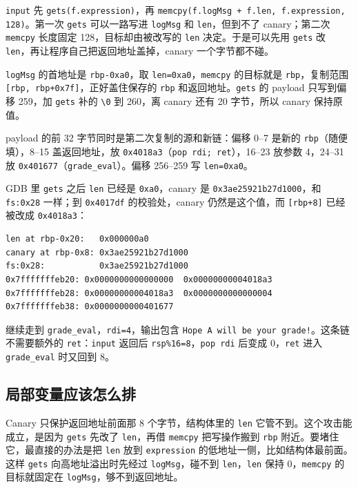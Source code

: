 \documentclass[UTF8,11pt,fontset=fandol]{ctexart}
\newcommand{\code}[1]{\texttt{#1}}
\begin{document}
\code{input} 先 \code{gets(f.expression)}，再 \code{memcpy(f.logMsg + f.len, f.expression, 128)}。第一次 \code{gets} 可以一路写进 \code{logMsg} 和 \code{len}，但到不了 canary；第二次 \code{memcpy} 长度固定 128，目标却由被改写的 \code{len} 决定。于是可以先用 \code{gets} 改 \code{len}，再让程序自己把返回地址盖掉，canary 一个字节都不碰。

\code{logMsg} 的首地址是 \code{rbp-0xa0}，取 \code{len=0xa0}，\code{memcpy} 的目标就是 \code{rbp}，复制范围 \code{[rbp, rbp+0x7f]}，正好盖住保存的 \code{rbp} 和返回地址。\code{gets} 的 payload 只写到偏移 259，加 \code{gets} 补的 \code{\textbackslash 0} 到 260，离 canary 还有 20 字节，所以 canary 保持原值。

payload 的前 32 字节同时是第二次复制的源和新链：偏移 0--7 是新的 \code{rbp}（随便填），8--15 盖返回地址，放 \code{0x4018a3}（\code{pop rdi; ret}），16--23 放参数 4，24--31 放 \code{0x401677}（\code{grade\_eval}）。偏移 256--259 写 \code{len=0xa0}。

GDB 里 \code{gets} 之后 \code{len} 已经是 \code{0xa0}，canary 是 \code{0x3ae25921b27d1000}，和 \code{fs:0x28} 一样；到 \code{0x4017df} 的校验处，canary 仍然是这个值，而 \code{[rbp+8]} 已经被改成 \code{0x4018a3}：

\begin{lstlisting}
len at rbp-0x20:   0x000000a0
canary at rbp-0x8: 0x3ae25921b27d1000
fs:0x28:           0x3ae25921b27d1000
0x7fffffffeb20: 0x0000000000000000  0x00000000004018a3
0x7fffffffeb28: 0x00000000004018a3  0x0000000000000004
0x7fffffffeb38: 0x0000000000401677
\end{lstlisting}

继续走到 \code{grade\_eval}，\code{rdi=4}，输出包含 \code{Hope A will be your grade!}。这条链不需要额外的 \code{ret}：\code{input} 返回后 \code{rsp\%16=8}，\code{pop rdi} 后变成 0，\code{ret} 进入 \code{grade\_eval} 时又回到 8。

\subsection{局部变量应该怎么排}

Canary 只保护返回地址前面那 8 个字节，结构体里的 \code{len} 它管不到。这个攻击能成立，是因为 \code{gets} 先改了 \code{len}，再借 \code{memcpy} 把写操作搬到 \code{rbp} 附近。要堵住它，最直接的办法是把 \code{len} 放到 \code{expression} 的低地址一侧，比如结构体最前面。这样 \code{gets} 向高地址溢出时先经过 \code{logMsg}，碰不到 \code{len}，\code{len} 保持 0，\code{memcpy} 的目标就固定在 \code{logMsg}，够不到返回地址。
\end{document}
